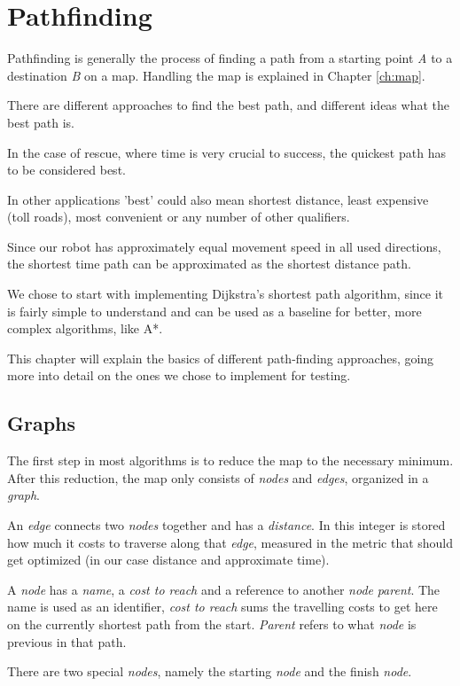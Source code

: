 \chapter{Pathfinding}\label{ch:path}
Pathfinding is generally the process of finding a path from a starting point \emph{A}
to a destination \emph{B}
on a map.
Handling the map is explained in Chapter \ref{ch:map}.

There are different approaches to find the best path,
and different ideas what the best path is.

In the case of rescue, where time is very crucial to success,
the quickest path has to be considered best. \cite{Zipes2506}

In other applications 'best' could also mean shortest distance, least expensive (toll roads),
most convenient or any number of other qualifiers.

Since our robot has approximately equal movement speed in all used directions,
the shortest time path can be approximated as the shortest distance path.

We chose to start with implementing Dijkstra's shortest path algorithm,
since it is fairly simple to understand and can be used as a baseline for better,
more complex algorithms, like A*.

This chapter will explain the basics of different path-finding approaches,
going more into detail on the ones we chose to implement for testing.

\section{Graphs}\label{sec:graphs}
The first step in most algorithms is to reduce the map to the necessary minimum.
After this reduction, the map only consists of \emph{nodes} and \emph{edges},
organized in a \emph{graph}.

An \emph{edge} connects two \emph{nodes} together and has a \emph{distance}.
In this integer is stored how much it costs to traverse along that \emph{edge},
measured in the metric that should get optimized (in our case distance and approximate time).

A \emph{node} has a \emph{name}, a \emph{cost to reach} and a reference to another \emph{node} \emph{parent}.
The name is used as an identifier,
\emph{cost to reach} sums the travelling costs to get here on the currently shortest path from the start.
\emph{Parent} refers to what \emph{node} is previous in that path.

There are two special \emph{nodes}, namely the starting \emph{node} and the finish \emph{node}.


